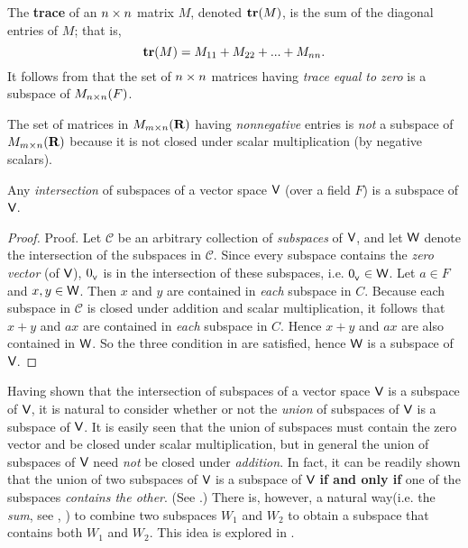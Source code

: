 \begin{example} \label{example 1.3.4}
The \textbf{trace} of an \(n \times n\) matrix \(M\), denoted \(\textbf{tr}(M)\), is the sum of the diagonal entries of \(M\);
that is,
\[
    \textbf{tr}(M) = M_{11} + M_{22} + ... + M_{nn}.
\]
It follows from  that the set of \(n \times n\) matrices having \emph{trace equal to zero} is a subspace of \(M_{n \times n}(F)\).
\end{example}

\begin{example} \label{example 1.3.5}
The set of matrices in \(M_{m \times n}(\mathbf{R})\) having \emph{nonnegative} entries is \emph{not} a subspace of \(M_{m \times n}(\mathbf{R})\) because it is not closed under scalar multiplication (by negative scalars).
\end{example}

\begin{theorem} \label{thm 1.4}
Any \emph{intersection} of subspaces of a vector space \(\textsf{V}\) (over a field \(F\)) is a subspace of \(\textsf{V}\).
\end{theorem}

\begin{proof}
Proof. Let \(\mathcal{C}\) be an arbitrary collection of \emph{subspaces} of \(\textsf{V}\), and let \(\textsf{W}\) denote the intersection of the subspaces in \(\mathcal{C}\).
Since every subspace contains the \emph{zero vector} (of \(\textsf{V}\)), \(0_{_{\textsf{V}}}\) is in the intersection of these subspaces, i.e. \(0_{_{\textsf{V}}} \in \textsf{W}\).
Let \(a \in F\) and \(x, y \in \textsf{W}\).
Then \(x\) and \(y\) are contained in \emph{each} subspace in \(C\). Because each subspace in \(\mathcal{C}\) is closed under addition and scalar multiplication, it follows that \(x + y\) and \(ax\) are contained in \emph{each} subspace in \(C\).
Hence \(x + y\) and \(ax\) are also contained in \(\textsf{W}\).
So the three condition in  are satisfied, hence \(\textsf{W}\) is a subspace of \(\textsf{V}\).
\end{proof}

Having shown that the intersection of subspaces of a vector space \(\textsf{V}\) is a subspace of \(\textsf{V}\), it is natural to consider whether or not the \emph{union} of subspaces of \(\textsf{V}\) is a subspace of \(\textsf{V}\).
It is easily seen that the union of subspaces must contain the zero vector and be closed under scalar multiplication, but in general the union of subspaces of \(\textsf{V}\) need \emph{not} be closed under \emph{addition}.
In fact, it can be readily shown that the union of two subspaces of \(\textsf{V}\) is a subspace of \(\textsf{V}\) \textbf{if and only if} one of the subspaces \emph{contains the other}. (See .)
There is, however, a natural way(i.e. the \emph{sum}, see , )  to combine two subspaces \(W_1\) and \(W_2\) to obtain a subspace that contains both \(W_1\) and \(W_2\).
This idea is explored in .

